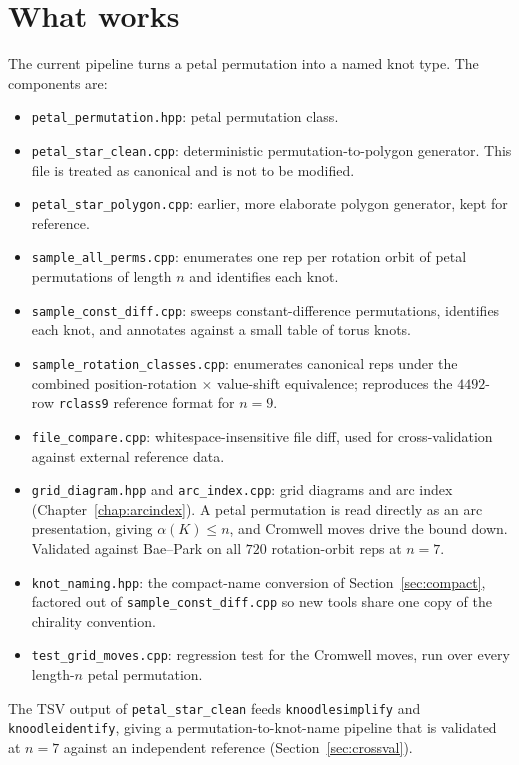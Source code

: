 \documentclass[11pt,oneside]{report}
\theoremstyle{definition}
\begin{document}
\section{What works}

The current pipeline turns a petal permutation into a named knot type. The
components are:
\begin{itemize}[leftmargin=2em]
\item \texttt{petal\_permutation.hpp}: petal permutation class.
\item \texttt{petal\_star\_clean.cpp}: deterministic permutation-to-polygon
generator. This file is treated as canonical and is not to be modified.
\item \texttt{petal\_star\_polygon.cpp}: earlier, more elaborate polygon
generator, kept for reference.
\item \texttt{sample\_all\_perms.cpp}: enumerates one rep per rotation
orbit of petal permutations of length $n$ and identifies each knot.
\item \texttt{sample\_const\_diff.cpp}: sweeps constant-difference
permutations, identifies each knot, and annotates against a small
table of torus knots.
\item \texttt{sample\_rotation\_classes.cpp}: enumerates canonical reps
under the combined position-rotation $\times$ value-shift equivalence;
reproduces the $4492$-row \texttt{rclass9} reference format for $n = 9$.
\item \texttt{file\_compare.cpp}: whitespace-insensitive file diff, used
for cross-validation against external reference data.
\item \texttt{grid\_diagram.hpp} and \texttt{arc\_index.cpp}: grid diagrams
and arc index (Chapter~\ref{chap:arcindex}). A petal permutation is read
directly as an arc presentation, giving $\alpha(K) \leq n$, and Cromwell
moves drive the bound down. Validated against Bae--Park on all $720$
rotation-orbit reps at $n = 7$.
\item \texttt{knot\_naming.hpp}: the compact-name conversion of
Section~\ref{sec:compact}, factored out of \texttt{sample\_const\_diff.cpp}
so new tools share one copy of the chirality convention.
\item \texttt{test\_grid\_moves.cpp}: regression test for the Cromwell
moves, run over every length-$n$ petal permutation.
\end{itemize}
The TSV output of \texttt{petal\_star\_clean} feeds
\texttt{knoodlesimplify} and \texttt{knoodleidentify}, giving a
permutation-to-knot-name pipeline that is validated at $n = 7$ against an
independent reference (Section~\ref{sec:crossval}).
\end{document}
